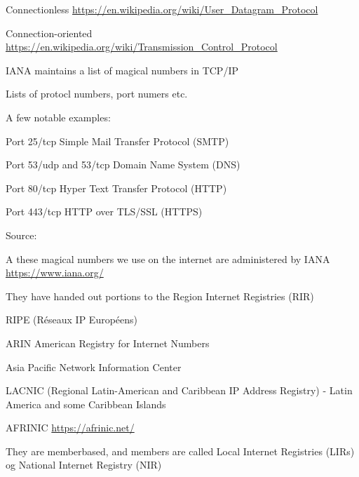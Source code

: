 \documentclass[Screen16to9,17pt]{foils}
\begin{document}
Connectionless \url{https://en.wikipedia.org/wiki/User_Datagram_Protocol}



Connection-oriented \url{https://en.wikipedia.org/wiki/Transmission_Control_Protocol}




\begin{list1}
\item IANA maintains a list of magical numbers in TCP/IP
\item Lists of protocl numbers, port numers etc.
\item A few notable examples:
\begin{list2}
\item Port 25/tcp Simple Mail Transfer Protocol (SMTP)
\item Port 53/udp and 53/tcp Domain Name System (DNS)
\item Port 80/tcp Hyper Text Transfer Protocol (HTTP)
\item Port 443/tcp HTTP over TLS/SSL (HTTPS)
\end{list2}
\item Source: 
\end{list1}



\begin{list1}
\item A these magical numbers we use on the internet are administered by IANA \url{https://www.iana.org/}
\item They have handed out portions to the Region Internet Registries (RIR)
\begin{list2}
\item RIPE (Réseaux IP Européens)  
\item ARIN American Registry for Internet Numbers 
\item Asia Pacific Network Information Center 
\item LACNIC (Regional Latin-American and Caribbean IP Address Registry) - Latin America and some Caribbean Islands
\end{list2}
\item AFRINIC \url{https://afrinic.net/}
\item They are memberbased, and members are called Local Internet Registries (LIRs) og National Internet Registry (NIR)
\end{list1}
\end{document}
